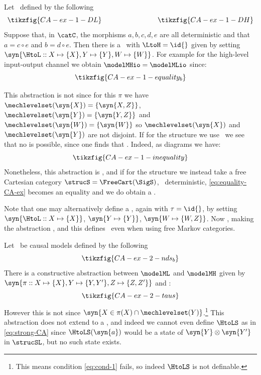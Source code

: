 \documentclass{article}
\begin{document}
\begin{example} \label{example:notsimple}
Let \ defined by the following  
\[
\tikzfig{CA-ex-1-DL}
\qquad \qquad \qquad \qquad 
\tikzfig{CA-ex-1-DH}
\]
Suppose that, in $\catC$, the morphisms $a,b,c,d,e$ are all deterministic and that $a=c \circ e$ and $b = d\circ e$. 
Then there is a \CCA\ with $\LtoH=\id{}$ given by setting $\syn{\HtoL :: X \mapsto \{X\}, Y \mapsto \{Y\}, W \mapsto \{W\}}$. For example for the high-level input-output channel we obtain $\modelMHio = \modelMLio$ since:  
\[
\tikzfig{CA-ex-1-equality_b}
\]

This abstraction is not \extrastrong{} since for this $\pi$ we have $\mechlevelset(\syn{X}) = \{\syn{X, Z}\}$, $\mechlevelset(\syn{Y}) = \{\syn{Y,Z}\}$ and $\mechlevelset(\syn{W}) = \{\syn{W}\}$ so $\mechlevelset(\syn{X})$ and $\mechlevelset(\syn{Y})$ are not disjoint. If for the structure we use \ we see that no \strucdown{} is possible, since one finds that . Indeed, as diagrams we have:
\begin{equation} \label{eq:equality-CA-ex}
\tikzfig{CA-ex-1-inequality}
\end{equation}
Nonetheless, this abstraction is \strong{}, and if for the structure we instead take a free Cartesian category $\strucS=\FreeCart(\SigS)$, \ deterministic, \eqref{eq:equality-CA-ex} becomes an equality and we do obtain a \strucdown.

Note that one may alternatively define a \CCA, again with $\tau = \id{}$, by setting $\syn{\HtoL :: X \mapsto \{X\}}$, $\syn{Y \mapsto \{Y\}}$, $\syn{W \mapsto \{W,Z\}}$. Now , making the abstraction \extrastrong{}, and this defines \
even when using free Markov categories. 
\end{example}

\begin{example}
Let \ be causal models defined by the following 
\[
\tikzfig{CA-ex-2-nds_b} 
\]
There is a constructive abstraction between $\modelML$ and $\modelMH$ given by $\syn{\pi :: X \mapsto \{X\}, Y \mapsto  \{Y,Y'\}, Z \mapsto \{Z,Z'\}}$ and : 
\[
\tikzfig{CA-ex-2-taus}
\]
However this is not \strong{} since $\syn{X \in \pi(X) \cap \mechlevelset(Y)}$.\footnote{This means condition \eqref{eq:cond-1} fails, so indeed $\HtoLS$ is not definable.} This abstraction does not extend to a \strucdown{}, and indeed we cannot even define $\HtoLS$ as in \eqref{eq:strong-CA} since $\HtoLS(\syn{a})$ would be a state of $\syn{Y} \otimes \syn{Y'}$ in $\strucSL$, but no such state exists.
\end{example}
\end{document}

